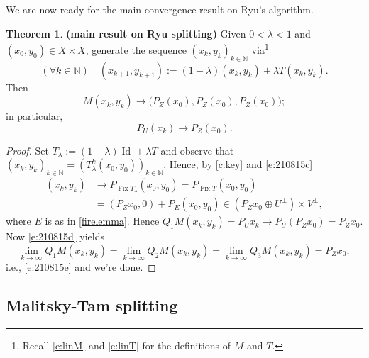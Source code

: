 \documentclass[11pt]{article}
\newcommand{\kkk}{\ensuremath{{k\in{\mathbb N}}}}
\newcommand{\Fix}{\ensuremath{\operatorname{Fix}}}
\newcommand{\Id}{\ensuremath{\operatorname{Id}}}
\theoremstyle{definition}
\newtheorem{theorem}{Theorem}[section]
\providecommand{\Id}{\operatorname{{ Id}}}
\providecommand{\Id}{\operatorname{Id}}
\begin{document}
{We are now ready for the main convergence result on Ryu's algorithm.

\begin{theorem} {\bf (main result on Ryu splitting)} 
Given $0<\lambda<1$ and $(x_0,y_0)\in X\times X$, generate
the sequence $(x_k,y_k)_\kkk$ via\footnote{Recall \cref{e:linM} and \cref{e:linT}
for the definitions of $M$ and $T$.}
\begin{equation*}
(\forall\kkk)\quad (x_{k+1},y_{k+1}) := (1-\lambda)(x_k,y_k)+\lambda T(x_k,y_k).
\end{equation*}
Then 
\begin{equation}
\label{e:210815e}
M(x_k,y_k)\to \big(P_Z(x_0),P_Z(x_0),P_Z(x_0)\big);
\end{equation}
in particular,
\begin{equation*}
P_U(x_k)\to P_Z(x_0).
\end{equation*}
\end{theorem}
\begin{proof}
Set $T_\lambda := (1-\lambda)\Id+\lambda T$ and observe that 
$(x_k,y_k)_\kkk = (T^k_\lambda(x_0,y_0))_\kkk$. 
Hence, by \cref{c:key} and \cref{e:210815c}
\begin{align*}
(x_k,y_k)&\to P_{\Fix T_\lambda}(x_0,y_0)=P_{\Fix T}(x_0,y_0)\\
&=(P_Zx_0,0)+P_E(x_0,y_0)\in (P_Zx_0\oplus U^\perp)\times V^\perp,
\end{align*}
where $E$ is as in \cref{firelemma}. 
Hence 
$Q_1M(x_k,y_k) = P_Ux_k \to P_U(P_Zx_0) = P_Zx_0$. 
Now \cref{e:210815d} yields
\begin{equation*}
\lim_{k\to\infty}Q_1M(x_k,y_k)=\lim_{k\to\infty}Q_2M(x_k,y_k)
= \lim_{k\to\infty}Q_3M(x_k,y_k)= P_Zx_0, 
\end{equation*}
i.e., \cref{e:210815e} and we're done.
\end{proof}


\subsection{Malitsky-Tam splitting}

\label{ss:MTlin}

}
\end{document}
